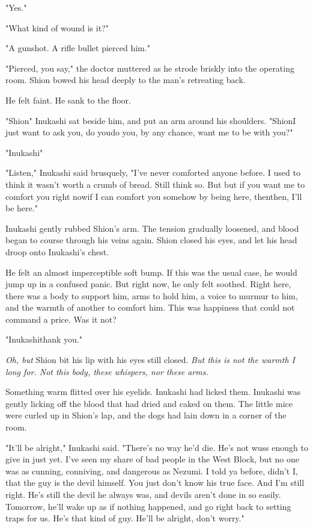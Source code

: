 "Yes."

"What kind of wound is it?"

"A gunshot. A rifle bullet pierced him."

"Pierced, you say," the doctor muttered as he strode briskly into the
operating room. Shion bowed his head deeply to the man's retreating
back.

He felt faint. He sank to the floor.

"Shion\el " Inukashi sat beside him, and put an arm around his shoulders.
"Shion\el I just want to ask you, do you\el do you, by any chance, want
me to be with you?"

"Inukashi\el "

"Listen," Inukashi said brusquely, "I've never comforted anyone before.
I used to think it wasn't worth a crumb of bread. Still think so. But\el 
but if you want me to comfort you right now\el if I can comfort you
somehow by being here, then\el then, I'll be here."

Inukashi gently rubbed Shion's arm. The tension gradually loosened, and
blood began to course through his veins again. Shion closed his eyes,
and let his head droop onto Inukashi's chest.

He felt an almost imperceptible soft bump. If this was the usual case,
he would jump up in a confused panic. But right now, he only felt
soothed. Right here, there was a body to support him, arms to hold him,
a voice to murmur to him, and the warmth of another to comfort him. This
was happiness that could not command a price. Was it not?

"Inukashi\el thank you."

\emph{Oh, but\el } Shion bit his lip with his eyes still closed. \emph{But this is not
the warmth I long for. Not this body, these whispers, nor these arms.}

Something warm flitted over his eyelids. Inukashi had licked them.
Inukashi was gently licking off the blood that had dried and caked on
them. The little mice were curled up in Shion's lap, and the dogs had
lain down in a corner of the room.

"It'll be alright," Inukashi said. "There's no way he'd die. He's not
wuss enough to give in just yet. I've seen my share of bad people in the
West Block, but no one was as cunning, conniving, and dangerous as
Nezumi. I told ya before, didn't I, that the guy is the devil himself.
You just don't know his true face. And I'm still right. He's still the
devil he always was, and devils aren't done in so easily. Tomorrow,
he'll wake up as if nothing happened, and go right back to setting traps
for us. He's that kind of guy. He'll be alright, don't worry."

